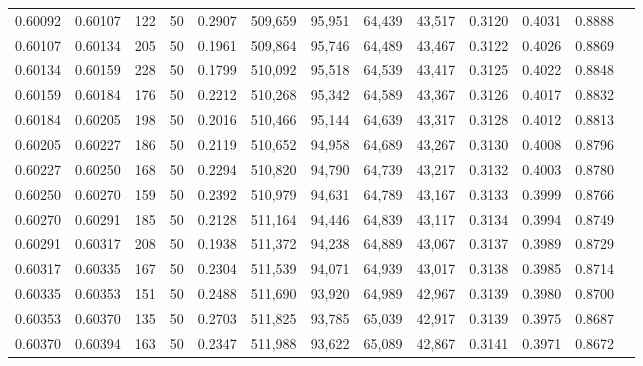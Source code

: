 \begin{tabular}{rrrrrrrrrrrrr}
0.60092 & 0.60107 &   122 &  50 &                                     0.2907 & 509,659 &  95,951 &  64,439 &  43,517 & 0.3120 & 0.4031 & 0.8888 \\
0.60107 & 0.60134 &   205 &  50 &                                     0.1961 & 509,864 &  95,746 &  64,489 &  43,467 & 0.3122 & 0.4026 & 0.8869 \\
0.60134 & 0.60159 &   228 &  50 &                                     0.1799 & 510,092 &  95,518 &  64,539 &  43,417 & 0.3125 & 0.4022 & 0.8848 \\
0.60159 & 0.60184 &   176 &  50 &                                     0.2212 & 510,268 &  95,342 &  64,589 &  43,367 & 0.3126 & 0.4017 & 0.8832 \\
0.60184 & 0.60205 &   198 &  50 &                                     0.2016 & 510,466 &  95,144 &  64,639 &  43,317 & 0.3128 & 0.4012 & 0.8813 \\
0.60205 & 0.60227 &   186 &  50 &                                     0.2119 & 510,652 &  94,958 &  64,689 &  43,267 & 0.3130 & 0.4008 & 0.8796 \\
0.60227 & 0.60250 &   168 &  50 &                                     0.2294 & 510,820 &  94,790 &  64,739 &  43,217 & 0.3132 & 0.4003 & 0.8780 \\
0.60250 & 0.60270 &   159 &  50 &                                     0.2392 & 510,979 &  94,631 &  64,789 &  43,167 & 0.3133 & 0.3999 & 0.8766 \\
0.60270 & 0.60291 &   185 &  50 &                                     0.2128 & 511,164 &  94,446 &  64,839 &  43,117 & 0.3134 & 0.3994 & 0.8749 \\
0.60291 & 0.60317 &   208 &  50 &                                     0.1938 & 511,372 &  94,238 &  64,889 &  43,067 & 0.3137 & 0.3989 & 0.8729 \\
0.60317 & 0.60335 &   167 &  50 &                                     0.2304 & 511,539 &  94,071 &  64,939 &  43,017 & 0.3138 & 0.3985 & 0.8714 \\
0.60335 & 0.60353 &   151 &  50 &                                     0.2488 & 511,690 &  93,920 &  64,989 &  42,967 & 0.3139 & 0.3980 & 0.8700 \\
0.60353 & 0.60370 &   135 &  50 &                                     0.2703 & 511,825 &  93,785 &  65,039 &  42,917 & 0.3139 & 0.3975 & 0.8687 \\
0.60370 & 0.60394 &   163 &  50 &                                     0.2347 & 511,988 &  93,622 &  65,089 &  42,867 & 0.3141 & 0.3971 & 0.8672 \\

\end{tabular}
